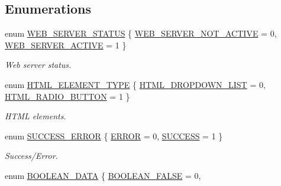 \subsection*{Enumerations}
\begin{DoxyCompactItemize}
\item 
enum \hyperlink{group__wireless__interface_gaf8c02aba93d7bcb5ecf758d4b9f2db53}{W\+E\+B\+\_\+\+S\+E\+R\+V\+E\+R\+\_\+\+S\+T\+A\+T\+US} \{ \hyperlink{group__wireless__interface_ggaf8c02aba93d7bcb5ecf758d4b9f2db53a5236a8f0be55d19397fc6d251c8782d8}{W\+E\+B\+\_\+\+S\+E\+R\+V\+E\+R\+\_\+\+N\+O\+T\+\_\+\+A\+C\+T\+I\+VE} = 0, 
\hyperlink{group__wireless__interface_ggaf8c02aba93d7bcb5ecf758d4b9f2db53a1f8d5f66915ac3a3fd7d31819c30784d}{W\+E\+B\+\_\+\+S\+E\+R\+V\+E\+R\+\_\+\+A\+C\+T\+I\+VE} = 1
 \}\begin{DoxyCompactList}\small\item\em Web server status. \end{DoxyCompactList}
\item 
enum \hyperlink{group__wireless__interface_ga2cc36b7c5f3111667d440d462542b02f}{H\+T\+M\+L\+\_\+\+E\+L\+E\+M\+E\+N\+T\+\_\+\+T\+Y\+PE} \{ \hyperlink{group__wireless__interface_gga2cc36b7c5f3111667d440d462542b02fad0268c4213dbfbc5f92a9af586630077}{H\+T\+M\+L\+\_\+\+D\+R\+O\+P\+D\+O\+W\+N\+\_\+\+L\+I\+ST} = 0, 
\hyperlink{group__wireless__interface_gga2cc36b7c5f3111667d440d462542b02fa49f36afe8081058042435061e55f6c6c}{H\+T\+M\+L\+\_\+\+R\+A\+D\+I\+O\+\_\+\+B\+U\+T\+T\+ON} = 1
 \}\begin{DoxyCompactList}\small\item\em H\+T\+ML elements. \end{DoxyCompactList}
\item 
enum \hyperlink{group__wireless__interface_ga2e53871073b531f122f463441c113633}{S\+U\+C\+C\+E\+S\+S\+\_\+\+E\+R\+R\+OR} \{ \hyperlink{group__wireless__interface_gga2e53871073b531f122f463441c113633a2fd6f336d08340583bd620a7f5694c90}{E\+R\+R\+OR} = 0, 
\hyperlink{group__wireless__interface_gga2e53871073b531f122f463441c113633ac7f69f7c9e5aea9b8f54cf02870e2bf8}{S\+U\+C\+C\+E\+SS} = 1
 \}\begin{DoxyCompactList}\small\item\em Success/\+Error. \end{DoxyCompactList}
\item 
enum \hyperlink{group__wireless__interface_ga8bb14f539316556e9d58cd68b262f7b0}{B\+O\+O\+L\+E\+A\+N\+\_\+\+D\+A\+TA} \{ \hyperlink{group__wireless__interface_gga8bb14f539316556e9d58cd68b262f7b0ab3f42bcdd6e94155abf3de8f5742dd9e}{B\+O\+O\+L\+E\+A\+N\+\_\+\+F\+A\+L\+SE} = 0, 

\end{DoxyCompactItemize}
